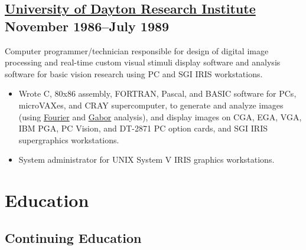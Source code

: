 \documentclass[10pt,letterpaper,oneside]{report}
\begin{document}
\begin{minipage}{\textwidth}
  \subsection[University of Dayton Research Institute]{
    \href{http://www.udri.udayton.edu/AboutUDRI/}{University of Dayton Research
    Institute} \hfill November 1986--July 1989
  }

  Computer programmer/technician responsible for design of digital image
  processing and real-time custom visual stimuli display software and analysis
  software for basic vision research using PC and SGI IRIS workstations.

  \begin{itemize}
    \item Wrote C, 80x86 assembly, FORTRAN, Pascal, and BASIC software for PCs,
      microVAXes, and CRAY supercomputer, to generate and analyze images (using
      \href{http://en.wikipedia.org/wiki/Fourier_analysis}{Fourier} and
      \href{http://en.wikipedia.org/wiki/Gabor_transform}{Gabor} analysis), and
      display images on CGA, EGA, VGA, IBM PGA, PC Vision, and DT-2871 PC option
      cards, and SGI IRIS supergraphics workstations.

    \item System administrator for UNIX System V IRIS graphics workstations.
  \end{itemize}
\end{minipage}

\section{Education}

\subsection{Continuing Education}
\end{document}
